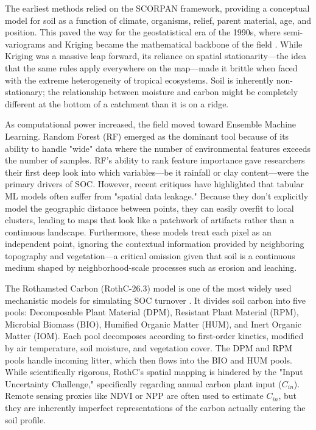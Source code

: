 \documentclass[conference]{IEEEtran}
\begin{document}
The earliest methods relied on the SCORPAN framework, providing a conceptual model for soil as a function of climate, organisms, relief, parent material, age, and position. This paved the way for the geostatistical era of the 1990s, where semi-variograms and Kriging became the mathematical backbone of the field \cite{b1}. While Kriging was a massive leap forward, its reliance on spatial stationarity—the idea that the same rules apply everywhere on the map—made it brittle when faced with the extreme heterogeneity of tropical ecosystems. Soil is inherently non-stationary; the relationship between moisture and carbon might be completely different at the bottom of a catchment than it is on a ridge.

As computational power increased, the field moved toward Ensemble Machine Learning. Random Forest (RF) emerged as the dominant tool because of its ability to handle "wide" data where the number of environmental features exceeds the number of samples. RF’s ability to rank feature importance gave researchers their first deep look into which variables—be it rainfall or clay content—were the primary drivers of SOC. However, recent critiques have highlighted that tabular ML models often suffer from "spatial data leakage." Because they don't explicitly model the geographic distance between points, they can easily overfit to local clusters, leading to maps that look like a patchwork of artifacts rather than a continuous landscape. Furthermore, these models treat each pixel as an independent point, ignoring the contextual information provided by neighboring topography and vegetation—a critical omission given that soil is a continuous medium shaped by neighborhood-scale processes such as erosion and leaching.

The Rothamsted Carbon (RothC-26.3) model is one of the most widely used mechanistic models for simulating SOC turnover \cite{b2}. It divides soil carbon into five pools: Decomposable Plant Material (DPM), Resistant Plant Material (RPM), Microbial Biomass (BIO), Humified Organic Matter (HUM), and Inert Organic Matter (IOM). Each pool decomposes according to first-order kinetics, modified by air temperature, soil moisture, and vegetation cover. The DPM and RPM pools handle incoming litter, which then flows into the BIO and HUM pools. While scientifically rigorous, RothC's spatial mapping is hindered by the "Input Uncertainty Challenge," specifically regarding annual carbon plant input ($C_{in}$). Remote sensing proxies like NDVI or NPP are often used to estimate $C_{in}$, but they are inherently imperfect representations of the carbon actually entering the soil profile.
\end{document}

